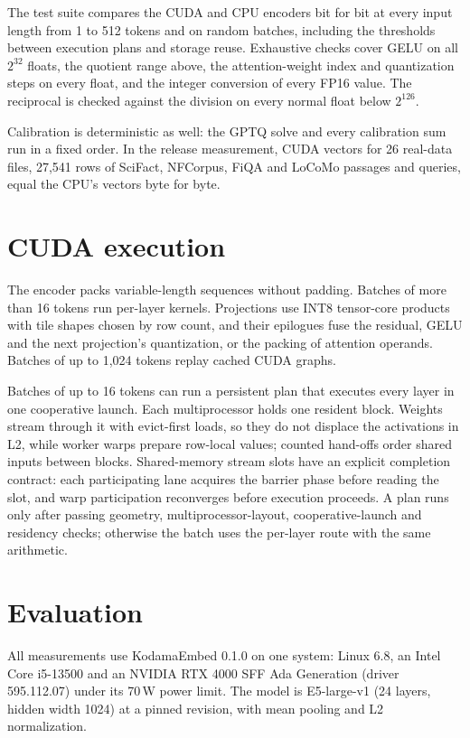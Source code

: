 \documentclass[10pt]{article}
\begin{document}
The test suite compares the CUDA and CPU encoders bit for bit at every input
length from 1 to 512 tokens and on random batches, including the thresholds
between execution plans and storage reuse. Exhaustive
checks cover GELU on all $2^{32}$ floats, the quotient range above, the
attention-weight index and quantization steps on every float, and the integer
conversion of every FP16 value. The reciprocal is checked against the
division on every normal float below $2^{126}$.

Calibration is deterministic as well: the GPTQ solve and every calibration
sum run in a fixed order. In the release measurement, CUDA vectors for 26
real-data files, 27,541 rows of SciFact, NFCorpus, FiQA and LoCoMo passages
and queries, equal the CPU's vectors byte for byte.

\section{CUDA execution}
\label{sec:cuda}

The encoder packs variable-length sequences without padding. Batches of more
than 16 tokens run per-layer kernels. Projections use INT8 tensor-core
products with tile shapes chosen by row count, and their epilogues fuse the
residual, GELU and the next projection's quantization, or the packing of
attention operands. Batches of up to 1,024 tokens replay cached CUDA graphs.

Batches of up to 16 tokens can run a persistent plan that executes every
layer in one cooperative launch. Each multiprocessor holds one resident block.
Weights stream through it with evict-first loads, so they do not displace the
activations in L2, while worker warps prepare row-local values; counted
hand-offs order shared inputs between blocks. Shared-memory
stream slots have an explicit completion contract: each participating lane
acquires the barrier phase before reading the slot, and warp participation
reconverges before execution proceeds. A plan runs only after passing
geometry, multiprocessor-layout, cooperative-launch and residency checks;
otherwise the batch uses the per-layer route with the same arithmetic.

\section{Evaluation}
\label{sec:evaluation}

All measurements use KodamaEmbed 0.1.0 on one system: Linux 6.8, an Intel
Core i5-13500 and an NVIDIA RTX 4000 SFF Ada Generation (driver 595.112.07)
under its 70\,W power limit. The model is E5-large-v1 (24 layers, hidden
width 1024) at a pinned revision, with mean pooling and L2 normalization.
\end{document}
